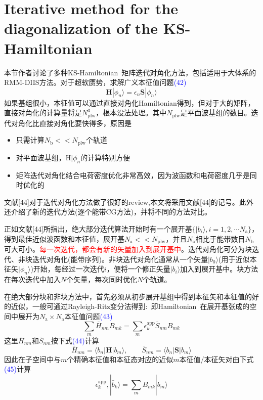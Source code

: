 \documentclass[14pt]{article}      %
\begin{document}
\section{Iterative method for the diagonalization of the KS-Hamiltonian}
本节作者讨论了多种\textrm{KS-Hamiltonian~}矩阵迭代对角化方法，包括适用于大体系的\textrm{RMM-DIIS}方法。对于超软赝势，求解广义本征值问题\textcolor{blue}{(42)}
\begin{displaymath}
	\mathbf{H}|\phi_n\rangle=\epsilon_n\mathbf{S}|\phi_n\rangle
\end{displaymath}
如果基组很小，本征值可以通过直接对角化\textrm{Hamiltonian}得到，但对于大的矩阵，直接对角化的计算量将是$N_{\mathrm{plw}}^3$，根本没法处理。其中$N_{\mathrm{plw}}$是平面波基组的数目。迭代对角化比直接对角化要快得多，原因是
\begin{itemize}
	\item 只需计算$N_{\mathrm{b}}<<N_{\mathrm{plw}}$个轨道
	\item 对平面波基组，$\mathrm{H}|\phi_n$的计算特别方便
	\item 矩阵迭代对角化结合电荷密度优化非常高效，因为波函数和电荷密度几乎是同时优化的
\end{itemize}
文献[44]对于迭代对角化方法做了很好的\textrm{review},本文将采用文献[44]的记号。此外还介绍了新的迭代方法(逐个能带\textrm{CG}方法)，并将不同的方法对比。

正如文献[44]所指出，绝大部分迭代算法开始时有一个展开基$\{|b_i\rangle,i=1,2,\cdots N_{\mathrm{a}}\}$，得到最佳近似波函数和本征值，展开基$N_{\mathrm{a}}<<N_{\mathrm{plw}}$，并且$N_{\mathrm a}$相比于能带数目$N_{\mathrm{b}}$可大可小。\textcolor{red}{每一次迭代，都会有新的矢量加入到展开基中}。迭代对角化可分为块迭代、非块迭代对角化(能带序列)。非块迭代对角化通常从一个矢量$|b_0\rangle$(用于近似本征矢$|\phi_n\rangle$)开始，每经过一次迭代$i$，便将一个修正矢量$|b_i\rangle$加入到展开基中。块方法在每次迭代中加入$N$个矢量，每次同时优化$N$个轨道。

在绝大部分块和非块方法中，首先必须从初步展开基组中得到本征矢和本征值的好的近似，一般可通过\textrm{Rayleigh-Ritz}变分法得到:~即\textrm{Hamiltonian~}在展开基张成的空间中展开为$N_{\mathrm{a}}\times N_{\mathrm{a}}$本征值问题\textcolor{blue}{(43)}
\begin{displaymath}
	\sum_m\bar{H}_{nm}B_{mk}=\sum_m\epsilon_k^{\mathrm{app}}\bar{S}_{nm}B_{mk}
\end{displaymath}
这里$\bar{H}_{nm}$和$\bar{S}_{nm}$按下式\textcolor{blue}{(44)}计算
\begin{displaymath}
	\bar{H}_{nm}=\langle b_n|\mathbf{H}|b_m\rangle,\qquad\bar{S}_{nm}=\langle b_n|\mathbf{S}|b_m\rangle
\end{displaymath}
因此在子空间中与$m$个精确本征值和本征态对应的近似$m$本征值/本征矢对由下式\textcolor{blue}{(45)}计算
\begin{displaymath}
	\epsilon_k^{\mathrm{app}},|\bar{b}_k\rangle=\sum_mB_{mk}|b_m\rangle
\end{displaymath}
\end{document}
